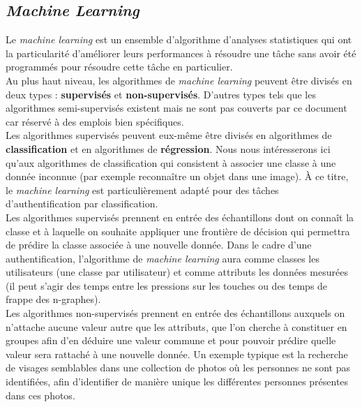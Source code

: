 \subsection{\textit{Machine Learning}}

Le \textit{machine learning} est un ensemble d'algorithme d'analyses statistiques qui ont la particularité d'améliorer leurs performances à résoudre une tâche sans avoir été programmés pour résoudre cette tâche en particulier.\\

Au plus haut niveau, les algorithmes de \textit{machine learning} peuvent être divisés en deux types : \textbf{supervisés} et \textbf{non-supervisés}. D'autres types tels que les algorithmes semi-supervisés existent mais ne sont pas couverts par ce document car réservé à des emplois bien spécifiques.\\

Les algorithmes supervisés peuvent eux-même être divisés en algorithmes de \textbf{classification} et en algorithmes de \textbf{régression}. Nous nous intéresserons ici qu'aux algorithmes de classification qui consistent à associer une classe à une donnée inconnue (par exemple reconnaître un objet dans une image). À ce titre, le \textit{machine learning} est particulièrement adapté pour des tâches d'authentification par classification.\\

Les algorithmes supervisés prennent en entrée des échantillons dont on connaît la classe et à laquelle on souhaite appliquer une frontière de décision qui permettra de prédire la classe associée à une nouvelle donnée. Dans le cadre d'une authentification, l'algorithme de \textit{machine learning} aura comme classes les utilisateurs (une classe par utilisateur) et comme attributs les données mesurées (il peut s'agir des temps entre les pressions sur les touches\cite{giotGREYC} ou des temps de frappe des n-graphes\cite{Hu2008}).\\

Les algorithmes non-supervisés prennent en entrée des échantillons auxquels on n'attache aucune valeur autre que les attributs, que l'on cherche à constituer en groupes afin d'en déduire une valeur commune et pour pouvoir prédire quelle valeur sera rattaché à une nouvelle donnée. Un exemple typique est la recherche de visages semblables dans une collection de photos où les personnes ne sont pas identifiées, afin d'identifier de manière unique les différentes personnes présentes dans ces photos.\\

